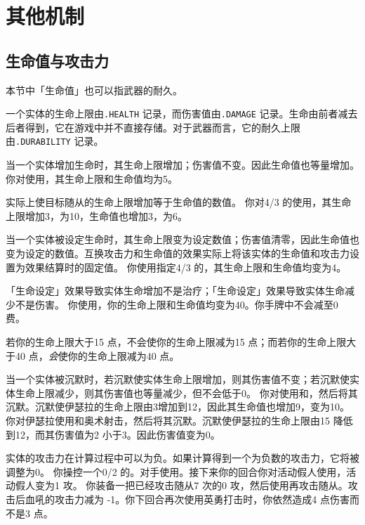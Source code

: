 \chapter{其他机制}

\section{生命值与攻击力}

本节中「生命值」也可以指武器的耐久。

一个实体的生命上限由\texttt{.HEALTH} 记录，而伤害值由\texttt{.DAMAGE} 记录。生命由前者减去后者得到，它在游戏中并不直接存储。对于武器而言，它的耐久上限由\texttt{.DURABILITY} 记录。

当一个实体增加生命时，其生命上限增加；伤害值不变。因此生命值也等量增加。
\example 你对使用，其生命上限和生命值均为5。

\notice {}实际上使目标随从的生命上限增加等于生命值的数值。
\example 你对4/3 的使用，其生命上限增加3，为10，生命值也增加3，为6。

当一个实体被设定生命时，其生命上限变为设定数值；伤害值清零，因此生命值也变为设定的数值。互换攻击力和生命值的效果实际上将该实体的生命值和攻击力设置为效果结算时的固定值。
\example 你使用指定4/3 的，其生命上限和生命值均变为4。

\notice 「生命设定」效果导致实体生命增加不是治疗；「生命设定」效果导致实体生命减少不是伤害。
\example 你使用，你的生命上限和生命值均变为40。你手牌中不会减至0 费。

\notice 若你的生命上限大于15 点，不会使你的生命上限减为15 点；而若你的生命上限大于40 点，\emph{会}使你的生命上限减为40 点。

当一个实体被沉默时，若沉默使实体生命上限增加，则其伤害值不变；若沉默使实体生命上限减少，则其伤害值也等量减少，但不会低于0。
\example 你对使用和，然后将其沉默。沉默使伊瑟拉的生命上限由3增加到12，因此其生命值也增加9，变为10。
\example 你对伊瑟拉使用和奥术射击，然后将其沉默。沉默使伊瑟拉的生命上限由15 降低到12，而其伤害值为2 小于3。因此伤害值变为0。

实体的攻击力在计算过程中可以为负。如果计算得到一个为负数的攻击力，它将被调整为0。
\example 你操控一个0/2 的。对手使用。接下来你的回合你对活动假人使用，活动假人变为1 攻。
\example 你装备一把已经攻击随从7 次的0 攻，然后使用再攻击随从。攻击后血吼的攻击力减为 -1。你下回合再次使用英勇打击时，你依然造成4 点伤害而不是3 点。

